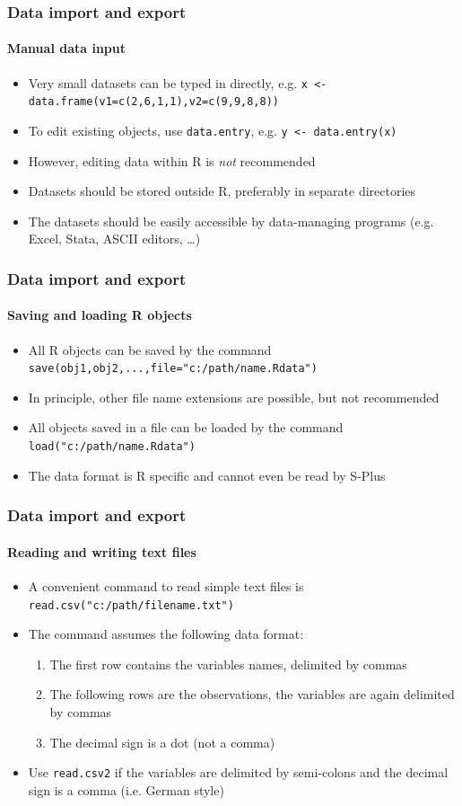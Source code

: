\documentclass[title={Introduction to R}, author={Mutschler and Zaharieva}, inst={Institute for Econometrics and Empirical Economics}]{beamer}
\begin{document}
\begin{frame}
\frametitle{Data import and export}
\framesubtitle{Manual data input}
\begin{itemize}
\item Very small datasets can be typed in directly, e.g.\newline
\texttt{x <- data.frame(v1=c(2,6,1,1),v2=c(9,9,8,8))}
\item To edit existing objects, use \texttt{data.entry}, e.g.\newline
\texttt{y <- data.entry(x)}
\item However, editing data within R is \emph{not} recommended
\item Datasets should be stored outside R, preferably in separate directories
\item The datasets should be easily accessible by data-managing programs
(e.g. Excel, Stata, ASCII editors, \ldots )
\end{itemize}
\end{frame}

\begin{frame}
\frametitle{Data import and export}
\framesubtitle{Saving and loading R objects}
\begin{itemize}
\item All R objects can be saved by the command\newline
\texttt{save(obj1,obj2,...,file="c:/path/name.Rdata")}
\item In principle, other file name extensions are possible, \newline
but not recommended
\item All objects saved in a file can be loaded by the command\newline
\texttt{load("c:/path/name.Rdata")}
\item The data format is R specific and cannot even be read \newline
by S-Plus
\end{itemize}
\end{frame}

\begin{frame}
\frametitle{Data import and export}
\framesubtitle{Reading and writing text files}
\begin{itemize}
\item A convenient command to read simple text files is \newline
\texttt{read.csv("c:/path/filename.txt")}
\item The command assumes the following data format:
\begin{enumerate}
\item The first row contains the variables names, delimited by commas
\item The following rows are the observations, the variables are again
delimited by commas
\item The decimal sign is a dot (not a comma)
\end{enumerate}
\item Use \texttt{read.csv2} if the variables are delimited by semi-colons
and the decimal sign is a comma (i.e. German style)
\end{itemize}
\end{frame}
\end{document}
